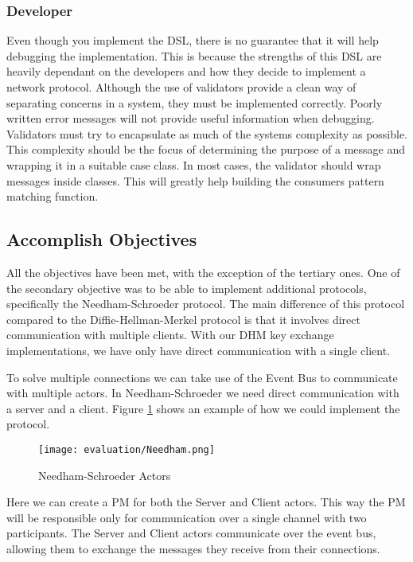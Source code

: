 \subsubsection{Developer}
Even though you implement the DSL, there is no guarantee that it will help debugging the implementation. This is because the strengths of this DSL are heavily dependant on the developers and how they decide to implement a network protocol. Although the use of validators provide a clean way of separating concerns in a system, they must be implemented correctly. Poorly written error messages will not provide useful information when debugging. Validators must try to encapsulate as much of the systems complexity as possible. This complexity should be the focus of determining the purpose of a message and wrapping it in a suitable case class. In most cases, the validator should wrap messages inside classes. This will greatly help building the consumers pattern matching function.


\subsection{Accomplish Objectives}
All the objectives have been met, with the exception of the tertiary ones. One of the secondary objective was to be able to implement additional protocols, specifically the Needham-Schroeder protocol. The main difference of this protocol compared to the Diffie-Hellman-Merkel protocol is that it involves direct communication with multiple clients. With our DHM key exchange implementations, we have only have direct communication with a single client.

To solve multiple connections we can take use of the Event Bus to communicate with multiple actors. In Needham-Schroeder we need direct communication with a server and a client. Figure \ref{fig:Needham} shows an example of how we could implement the protocol. 

\begin{figure}[H]
  \centering
  \texttt{[image: evaluation/Needham.png]}
  \caption{Needham-Schroeder Actors}
  \label{fig:Needham}
\end{figure}

Here we can create a PM for both the Server and Client actors. This way the PM will be responsible only for communication over a single channel with two participants. The Server and Client actors communicate over the event bus, allowing them to exchange the messages they receive from their connections.

